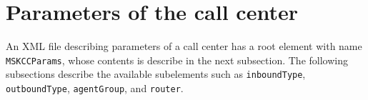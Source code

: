 \section{Parameters of the call center}
\label{sec:mskccparams}

An XML file describing parameters of a call center has a root element
with name
\texttt{MSKCCParams}, whose contents is
describe in the next subsection.
The following subsections describe the available subelements such as
\texttt{inbound\-Type}, \texttt{outbound\-Type},
\texttt{agent\-Group}, and \texttt{router}.
